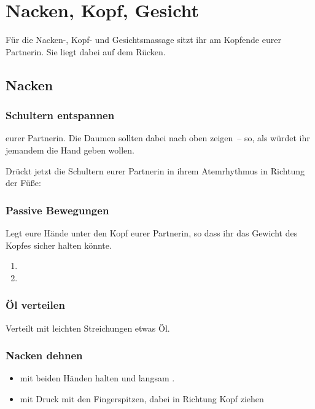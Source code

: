 \section{Nacken, Kopf, Gesicht}

Für die Nacken-, Kopf- und Gesichtsmassage sitzt ihr am Kopfende eurer Partnerin. Sie liegt dabei auf dem Rücken.

\subsection{Nacken}

\subsubsection{Schultern entspannen}
 eurer Partnerin. Die Daumen sollten dabei nach oben zeigen~-- so, als würdet ihr jemandem die Hand geben wollen.

Drückt jetzt die Schultern eurer Partnerin in ihrem Atemrhythmus in Richtung der Füße: 

\subsubsection{Passive Bewegungen}

Legt eure Hände unter den Kopf eurer Partnerin, so dass ihr das Gewicht des Kopfes sicher halten könnte.

\begin{enumerate}
	\item {}
	\item {}
\end{enumerate}

\subsubsection{Öl verteilen}

Verteilt mit leichten Streichungen etwas Öl.

\subsubsection{Nacken dehnen}
\begin{itemize}
	\item {} mit beiden Händen halten und langsam .
	\item {} mit Druck mit den Fingerspitzen, dabei in Richtung Kopf ziehen
\end{itemize}

